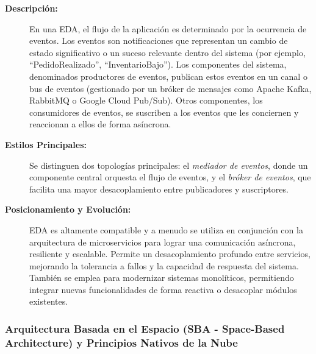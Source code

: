 \begin{description}
    \item[\textbf{Descripción:}] En una EDA, el flujo de la aplicación es determinado por la ocurrencia de eventos. Los eventos son notificaciones que representan un cambio de estado significativo o un suceso relevante dentro del sistema (por ejemplo, ``PedidoRealizado'', ``InventarioBajo''). Los componentes del sistema, denominados productores de eventos, publican estos eventos en un canal o bus de eventos (gestionado por un bróker de mensajes como Apache Kafka, RabbitMQ o Google Cloud Pub/Sub). Otros componentes, los consumidores de eventos, se suscriben a los eventos que les conciernen y reaccionan a ellos de forma asíncrona.
    \item[\textbf{Estilos Principales:}] Se distinguen dos topologías principales: el \textit{mediador de eventos}, donde un componente central orquesta el flujo de eventos, y el \textit{bróker de eventos}, que facilita una mayor desacoplamiento entre publicadores y suscriptores.
    \item[\textbf{Posicionamiento y Evolución:}] EDA es altamente compatible y a menudo se utiliza en conjunción con la arquitectura de microservicios para lograr una comunicación asíncrona, resiliente y escalable. Permite un desacoplamiento profundo entre servicios, mejorando la tolerancia a fallos y la capacidad de respuesta del sistema. También se emplea para modernizar sistemas monolíticos, permitiendo integrar nuevas funcionalidades de forma reactiva o desacoplar módulos existentes.
\end{description}

\subsubsection*{Arquitectura Basada en el Espacio (SBA - Space-Based Architecture) y Principios Nativos de la Nube}

